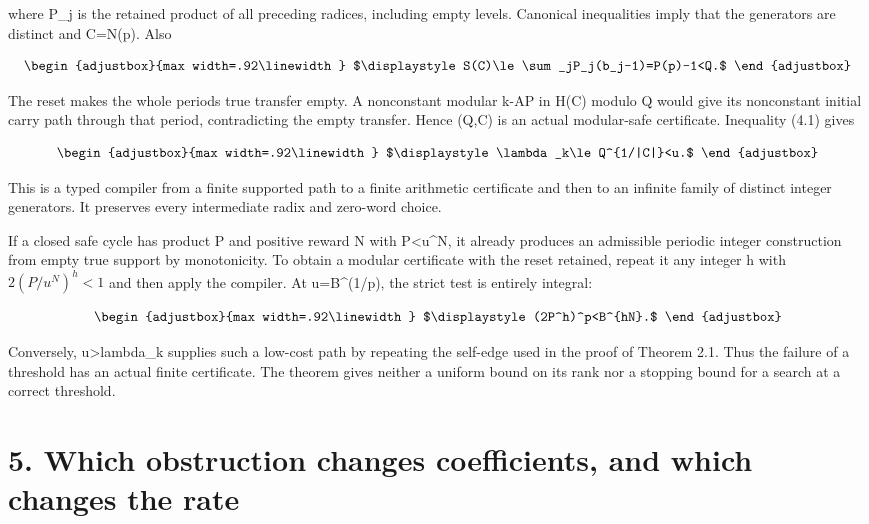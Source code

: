where P\_j is the retained product of all preceding radices, including empty levels. Canonical inequalities imply that the generators are distinct and \textbar C\textbar=N(p). Also

\[
\begin{adjustbox}{max width=.92\linewidth}
$\displaystyle S(C)\le\sum_jP_j(b_j-1)=P(p)-1<Q.$
\end{adjustbox}
\]

The reset makes the whole period\textquotesingle s true transfer empty. A nonconstant modular k-AP in H(C) modulo Q would give its nonconstant initial carry path through that period, contradicting the empty transfer. Hence (Q,C) is an actual modular-safe certificate. Inequality (4.1) gives

\[
\begin{adjustbox}{max width=.92\linewidth}
$\displaystyle \lambda_k\le Q^{1/|C|}<u.$
\end{adjustbox}
\]

This is a typed compiler from a finite supported path to a finite arithmetic certificate and then to an infinite family of distinct integer generators. It preserves every intermediate radix and zero-word choice.

If a closed safe cycle has product P and positive reward N with P\textless u\^{}N, it already produces an admissible periodic integer construction from empty true support by monotonicity. To obtain a modular certificate with the reset retained, repeat it any integer h with \(2(P/u^N)^h<1\) and then apply the compiler. At u=B\^{}(1/p), the strict test is entirely integral:

\[
\begin{adjustbox}{max width=.92\linewidth}
$\displaystyle (2P^h)^p<B^{hN}.$
\end{adjustbox}
\]

Conversely, u\textgreater lambda\_k supplies such a low-cost path by repeating the self-edge used in the proof of Theorem 2.1. Thus the failure of a threshold has an actual finite certificate. The theorem gives neither a uniform bound on its rank nor a stopping bound for a search at a correct threshold.

\section{5. Which obstruction changes coefficients, and which changes the rate}\label{n09-which-obstruction-changes-coefficients-and-which-changes-the-rate}

